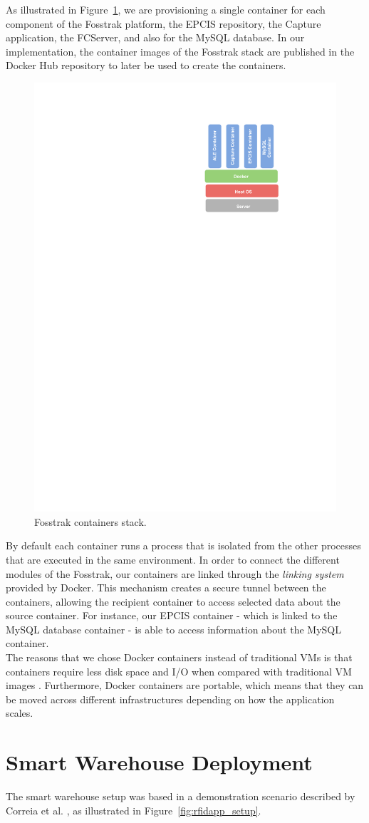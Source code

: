 As illustrated in Figure~\ref{fig:impl_containers}, we are provisioning a single container for each
component of the Fosstrak platform, the \gls{EPCIS} repository, the Capture application, the \gls{FCServer},
and also for the MySQL database. In our implementation, the container images of the Fosstrak stack
are published in the Docker Hub repository to later be used to create the containers.\\

\begin{figure}[!ht]
  \centering
  \includegraphics[width=.3\textwidth]{./images/docker-stack}
  \caption[Fosstrak containers stack.]{Fosstrak containers stack.}
  \label{fig:impl_containers}
\end{figure}

By default each container runs a process that is isolated from the other processes that are executed
in the same environment. In order to connect the different modules of the Fosstrak, our containers are
linked through the \textit{linking system} provided by Docker. This mechanism creates a secure tunnel
between the containers, allowing the recipient container to access selected data about the source container.
For instance, our \gls{EPCIS} container - which is linked to the MySQL database container - is able to
access information about the MySQL container.\\

The reasons that we chose Docker containers instead of traditional \glspl{VM} is that containers
require less disk space and I/O when compared with traditional \gls{VM} images \cite{merkel2014docker}.
Furthermore, Docker containers are portable, which means that they can be moved across different
infrastructures depending on how the application scales.

\section{Smart Warehouse Deployment}
\label{sec:Smart Place}
The smart warehouse setup was based in a demonstration scenario described by Correia et al. \cite{correiaalpharfid},
as illustrated in Figure~\ref{fig:rfidapp_setup}.\\

